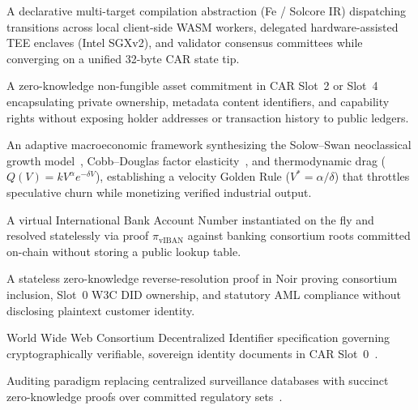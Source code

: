 \documentclass[a4paper,11pt,twoside,parskip=half-,headings=small]{scrartcl}
\begin{document}
\begin{description}[style=nextline,leftmargin=1.5em]
  \item[\hypertarget{glossary:zkapp_modes}{\textbf{Three Execution Placement Modes}} (\cref{sec:unified_zkapp_api})] A declarative multi-target compilation abstraction (Fe / Solcore IR) dispatching transitions across local client-side WASM workers, delegated hardware-assisted TEE enclaves (Intel SGXv2), and validator consensus committees while converging on a unified 32-byte CAR state tip.
  \item[\hypertarget{glossary:zknft}{\textbf{zkNFT}} (\cref{sec:zknft_cross_migration}, \cref{sec:tinyblock_ldraw})] A zero-knowledge non-fungible asset commitment in CAR Slot~2 or Slot~4 encapsulating private ownership, metadata content identifiers, and capability rights without exposing holder addresses or transaction history to public ledgers.
  \item[\hypertarget{glossary:velotility}{\textbf{Velotility Curve ($Q(V)$)}} (\cref{sec:velotility_math})] An adaptive macroeconomic framework synthesizing the Solow--Swan neoclassical growth model~\cite{solow1956}, Cobb--Douglas factor elasticity~\cite{cobbdouglas1928}, and thermodynamic drag ($Q(V) = k V^\alpha e^{-\delta V}$), establishing a velocity Golden Rule ($V^* = \alpha / \delta$) that throttles speculative churn while monetizing verified industrial output.
  \item[\hypertarget{glossary:viban}{\textbf{vIBAN / zkvIBAN}} (\cref{sec:zkviban_protocol})] A virtual International Bank Account Number instantiated on the fly and resolved statelessly via proof $\pi_{\text{vIBAN}}$ against banking consortium roots committed on-chain without storing a public lookup table.
  \item[\hypertarget{glossary:pi_viban}{\textbf{$\pi_{\text{vIBAN}}$}} (\cref{sec:zkviban_protocol})] A stateless zero-knowledge reverse-resolution proof in Noir proving consortium inclusion, Slot~0 W3C DID ownership, and statutory AML compliance without disclosing plaintext customer identity.
  \item[\hypertarget{glossary:w3c_did}{\textbf{W3C DID}} (\cref{sec:relationship_authority})] World Wide Web Consortium Decentralized Identifier specification governing cryptographically verifiable, sovereign identity documents in CAR Slot~0~\cite{w3cdid2022,dif2021did}.
  \item[\hypertarget{glossary:zkcompliance}{\textbf{zkCompliance}} (\cref{sec:statutory_compliance})] Auditing paradigm replacing centralized surveillance databases with succinct zero-knowledge proofs over committed regulatory sets~\cite{buterin2023privacypools}.

\end{description}
\end{document}
